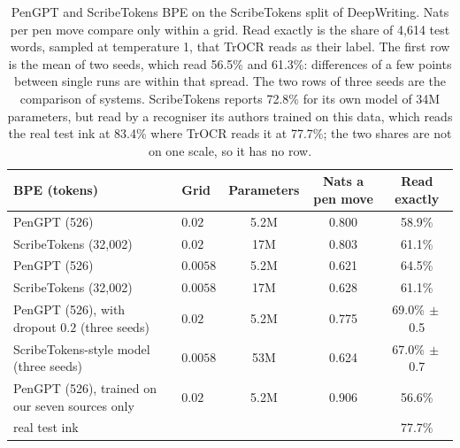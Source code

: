 \documentclass{article}
\begin{document}
\begin{table}[H]
\caption{PenGPT and ScribeTokens BPE on the ScribeTokens split of DeepWriting. Nats per pen move compare only within a grid. Read exactly is the share of 4,614 test words, sampled at temperature 1, that TrOCR reads as their label. The first row is the mean of two seeds, which read 56.5\% and 61.3\%: differences of a few points between single runs are within that spread. The two rows of three seeds are the comparison of systems. ScribeTokens reports 72.8\% for its own model of 34M parameters, but read by a recogniser its authors trained on this data, which reads the real test ink at 83.4\% where TrOCR reads it at 77.7\%; the two shares are not on one scale, so it has no row.}
\label{tab:scribetokens}
\vskip 0.1in
\begin{center}
\begin{small}
\begin{tabular}{llccc}
\toprule
BPE (tokens) & Grid & Parameters & Nats a pen move & Read exactly \\
\midrule
PenGPT (526) & $0.02$ & 5.2M & 0.800 & 58.9\% \\
ScribeTokens (32,002) & $0.02$ & 17M & 0.803 & 61.1\% \\
\midrule
PenGPT (526) & $0.0058$ & 5.2M & 0.621 & 64.5\% \\
ScribeTokens (32,002) & $0.0058$ & 17M & 0.628 & 61.1\% \\
\midrule
PenGPT (526), with dropout $0.2$ (three seeds) & $0.02$ & 5.2M & 0.775 & 69.0\%{\tiny$\,\pm$0.5} \\
ScribeTokens-style model (three seeds) & $0.0058$ & 53M & 0.624 & 67.0\%{\tiny$\,\pm$0.7} \\
\midrule
PenGPT (526), trained on our seven sources only & $0.02$ & 5.2M & 0.906 & 56.6\% \\
real test ink & & & & 77.7\% \\
\bottomrule
\end{tabular}
\end{small}
\end{center}
\end{table}
\end{document}

